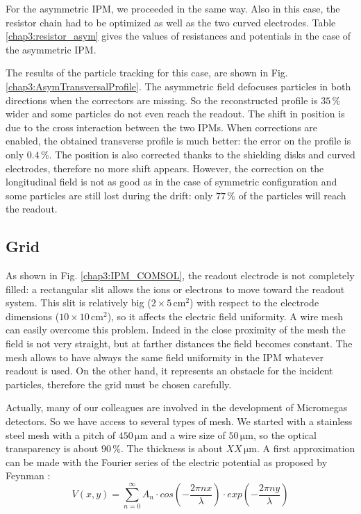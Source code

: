 \begin{refsection}
  For the asymmetric IPM, we proceeded in the same way. Also in this case, the resistor chain had to be optimized as well as the two curved electrodes. Table \ref{chap3:resistor_asym} gives the values of resistances and potentials in the case of the asymmetric IPM.

  

  The results of the particle tracking for this case, are shown in Fig. \ref{chap3:AsymTransversalProfile}. The asymmetric field defocuses particles in both directions when the correctors are missing. So the reconstructed profile is $35\,\mathrm{\%}$ wider and some particles do not even reach the readout. The shift in position is due to the cross interaction between the two IPMs. When corrections are enabled, the obtained transverse profile is much better: the error on the profile is only $0.4\,\mathrm{\%}$. The position is also corrected thanks to the shielding disks and curved electrodes, therefore no more shift appears. However, the correction on the longitudinal field is not as good as in the case of symmetric configuration and some particles are still lost during the drift: only $77\,\mathrm{\%}$ of the particles will reach the readout.

  

  \subsection{Grid}
  \label{chap3:sec:grid}
  As shown in Fig. \ref{chap3:IPM_COMSOL}, the readout electrode is not completely filled: a rectangular slit allows the ions or electrons to move toward the readout system. This slit is relatively big ($2\times5\,\mathrm{cm^{2}}$) with respect to the electrode dimensions ($10\times10\,\mathrm{cm^{2}}$), so it affects the electric field uniformity. A wire mesh can easily overcome this problem. Indeed in the close proximity of the mesh the field is not very straight, but at farther distances the field becomes constant. The mesh allows to have always the same field uniformity in the IPM whatever readout is used. On the other hand, it represents an obstacle for the incident particles, therefore the grid must be chosen carefully.

  Actually, many of our colleagues are involved in the development of Micromegas detectors. So we have access to several types of mesh. We started with a stainless steel mesh with a pitch of $450\,\mathrm{\mu m}$ and a wire size of $50\,\mathrm{\mu m}$, so the optical transparency is about $90\,\mathrm{\%}$. The thickness is about $XX\,\mathrm{\mu m}$. A first approximation can be made with the Fourier series of the electric potential as proposed by Feynman \cite{feynman2011feynman}:
  \begin{equation}
    V(x,y)= \sum^{\infty}_{n=0} A_{n} \cdot cos(-\frac{2\pi n x}{\lambda}) \cdot exp(-\frac{2\pi n y}{\lambda})
  \end{equation}


\end{refsection}
